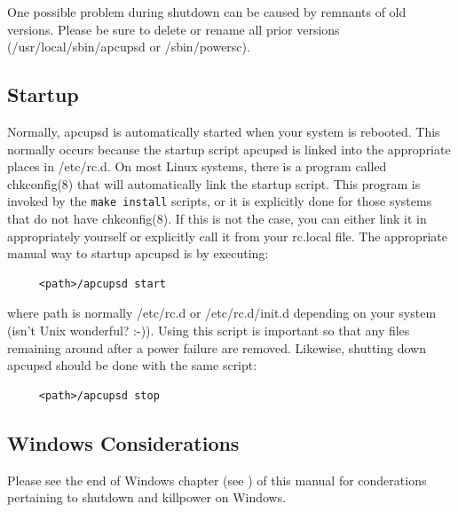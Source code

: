 {{{{{{{{{One possible problem during shutdown can be caused by remnants of old
versions. Please be sure to delete or rename all prior versions
(/usr/local/sbin/apcupsd or /sbin/powersc). 

\label{Startup}

\subsection*{Startup}

\label{index-Startup-260}
Normally, apcupsd is automatically started when your system is rebooted. This
normally occurs because the startup script apcupsd is linked into the
appropriate places in /etc/rc.d. On most Linux systems, there is a program
called chkconfig(8) that will automatically link the startup script.  This
program is invoked by the {\tt make install} scripts, or it is explicitly done
for those systems that do not have chkconfig(8). If this is not the case, you
can either link it in appropriately yourself or explicitly call it from your
rc.local file. The appropriate manual way to startup apcupsd is by executing: 

\footnotesize
\begin{verbatim}
     <path>/apcupsd start
\end{verbatim}
\normalsize

where \lt{}path\gt{} is normally /etc/rc.d or /etc/rc.d/init.d depending on
your system (isn't Unix wonderful? :-)). Using this script is important so
that any files remaining around after a power failure are removed. Likewise,
shutting down apcupsd should be done with the same script: 

\footnotesize
\begin{verbatim}
     <path>/apcupsd stop
\end{verbatim}
\normalsize

\label{Windows-Considerations}

\subsection*{Windows Considerations}

\label{index-Windows-Considerations-261}
Please see the end of Windows chapter (see 
) of this
manual for conderations pertaining to shutdown and killpower on Windows. 

}}}}}}}}}
